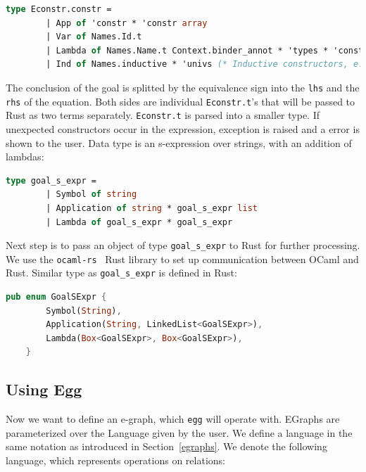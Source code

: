 \vspace{0.5cm}
\begin{lstlisting}[language=ocaml]
    type Econstr.constr = 
        | App of 'constr * 'constr array
        | Var of Names.Id.t
        | Lambda of Names.Name.t Context.binder_annot * 'types * 'constr
        | Ind of Names.inductive * 'univs (* Inductive constructors, e.g. True or False *)
\end{lstlisting}

The conclusion of the goal is splitted by the equivalence sign into the \texttt{lhs} and the \texttt{rhs} of the equation. Both sides are individual \texttt{Econstr.t}'s that will be passed to Rust as two terms separately. \texttt{Econstr.t} is parsed into a smaller type. If unexpected constructors occur in the expression, exception is raised and a error is shown to the user. Data type is an s-expression over strings, with an addition of lambdas: 

\vspace{0.5cm}
\begin{lstlisting}[language=ocaml]
    type goal_s_expr =
        | Symbol of string
        | Application of string * goal_s_expr list
        | Lambda of goal_s_expr * goal_s_expr
\end{lstlisting}

Next step is to pass an object of type \texttt{goal\_s\_expr} to Rust for further processing. We use the \texttt{ocaml-rs}~\cite{OCaml_rust_ffi} Rust library to set up communication between OCaml and Rust. Similar type as \texttt{goal\_s\_expr} is defined in Rust: 

\vspace{0.5cm}
\begin{lstlisting}[language=rust, style=colouredRust]
    pub enum GoalSExpr {
        Symbol(String),
        Application(String, LinkedList<GoalSExpr>),
        Lambda(Box<GoalSExpr>, Box<GoalSExpr>),
    }
\end{lstlisting}

\subsection{Using Egg}
Now we want to define an e-graph, which \texttt{egg} will operate with. EGraphs are parameterized over the Language given by the user. We define a language in the same notation as introduced in Section~\ref{egraphs}. We denote the following language, which represents operations on relations: 


